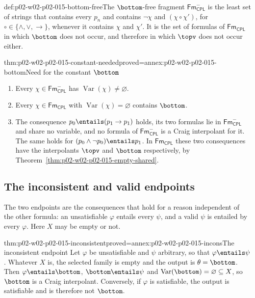 \begin{hbdefinition}{def:p02-w02-p02-015-bottom-free}{The \(\bottom\)-free fragment}
\(\mathsf{Fm}_{\mathsf{CPL}}^{-}\) is the least set of strings that contains every \(p_n\) and
contains \(\neg\chi\) and \((\chi\circ\chi')\), for
\(\circ\in\{\land,\lor,\to\}\), whenever it contains \(\chi\) and
\(\chi'\).  It is the set of formulas of \(\mathsf{Fm}_{\mathsf{CPL}}\) in which \(\bottom\)
does not occur, and therefore in which \(\topv\) does not occur either.
\end{hbdefinition}

\begin{hbtheorem}{thm:p02-w02-p02-015-constant-needed}{proved=annex:p02-w02-p02-015-bottom}{Need for the constant \(\bottom\)}
\begin{enumerate}
  \item Every \(\chi\in\mathsf{Fm}_{\mathsf{CPL}}^{-}\) has
        \(\operatorname{Var}(\chi)\neq\varnothing\).
  \item Every \(\chi\in\mathsf{Fm}_{\mathsf{CPL}}\) with
        \(\operatorname{Var}(\chi)=\varnothing\) contains \(\bottom\).
  \item The consequence \(p_0\entails(p_1\to p_1)\) holds, its two formulas
        lie in \(\mathsf{Fm}_{\mathsf{CPL}}^{-}\) and share no variable, and no formula of
        \(\mathsf{Fm}_{\mathsf{CPL}}^{-}\) is a Craig interpolant for it.  The same holds for
        \((p_0\land\neg p_0)\entails p_1\).  In \(\mathsf{Fm}_{\mathsf{CPL}}\) these two
        consequences have the interpolants \(\topv\) and \(\bottom\)
        respectively, by Theorem~\ref{thm:p02-w02-p02-015-empty-shared}.
\end{enumerate}
\end{hbtheorem}

\subsection{The inconsistent and valid endpoints}
\label{sec:p02-w02-p02-015-endpoints}

The two endpoints are the consequences that hold for a reason independent of
the other formula: an unsatisfiable \(\varphi\) entails every \(\psi\), and a
valid \(\psi\) is entailed by every \(\varphi\).  Here \(X\) may be empty or
not.

\begin{hbtheorem}{thm:p02-w02-p02-015-inconsistent}{proved=annex:p02-w02-p02-015-incons}{The inconsistent endpoint}
Let \(\varphi\) be unsatisfiable and \(\psi\) arbitrary, so that
\(\varphi\entails\psi\).  Whatever \(X\) is, the selected family is empty and
the output is \(\theta=\bottom\).  Then \(\varphi\entails\bottom\),
\(\bottom\entails\psi\) and
\(\operatorname{Var}(\bottom)=\varnothing\subseteq X\), so \(\bottom\) is a
Craig interpolant.  Conversely, if \(\varphi\) is satisfiable, the output is
satisfiable and is therefore not \(\bottom\).
\end{hbtheorem}

